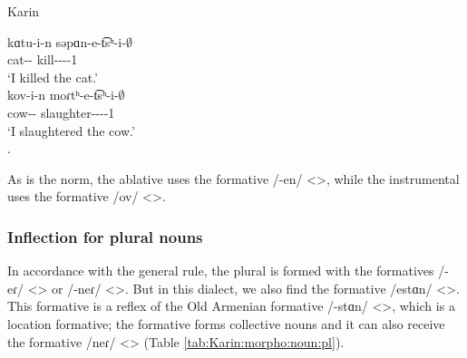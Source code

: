 \begin{exe}
	\ex Karin \label{sent:Karin:morpho:noun:DOM}
	\begin{xlist}
		\ex \gll kɑtu-i-n səpɑn-e-t͡sʰ-i-$\emptyset$ \\ 
		cat-{\dat}-{} kill-{\thgloss}-{\aor}-{\pst}-1{\sg} \\
		\trans `I killed the cat.'\\
		\ex \gll kov-i-n moɾtʰ-e-t͡sʰ-i-$\emptyset$ \\ 
		cow-{\dat}-{} slaughter-{\thgloss}-{\aor}-{\pst}-1{\sg} \\
		\trans `I slaughtered the cow.'\\
		. 
	\end{xlist}
\end{exe}

As is the norm, the ablative uses the formative /-en/ <>, while the instrumental uses the formative /ov/ <>. 

\subsubsection{Inflection for plural nouns}

In accordance with the general rule, the plural is formed with the formatives /-eɾ/ <> or /-neɾ/ <>. But in this dialect, we also find the formative /estɑn/ <>. This formative is a reflex of the Old Armenian formative /-stɑn/ <>, which is a location formative; the formative forms collective nouns and it can also receive the formative /neɾ/ <> (Table \ref{tab:Karin:morpho:noun:pl}). 




